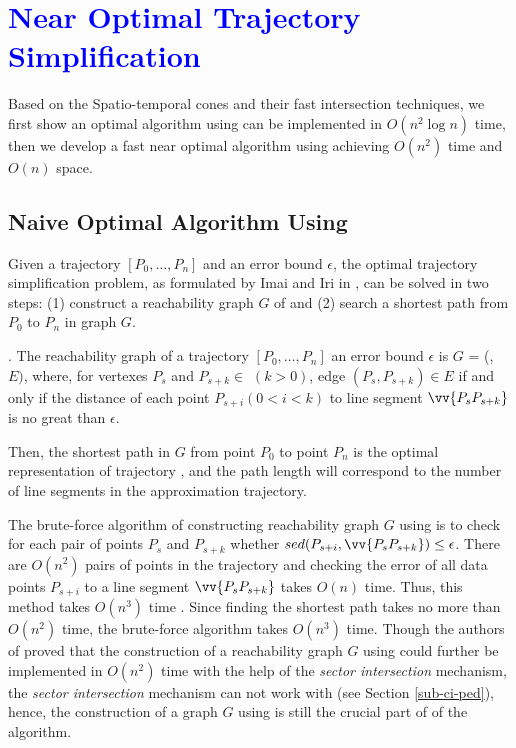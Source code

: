 \section{\textcolor{blue}{Near Optimal Trajectory Simplification}}
\label{sec-optimal}

Based on the Spatio-temporal cones and their fast intersection techniques, we first show an optimal algorithm using \sed can be implemented in $O(n^2\log n)$ time, then we develop a fast near optimal algorithm using \sed achieving $O(n^2)$ time and $O(n)$ space.

\subsection{Naive Optimal Algorithm Using \sed}

Given a trajectory ${[P_0, \ldots, P_n]}$ and an error bound $\epsilon$, the optimal trajectory simplification problem, as formulated by Imai and Iri in \cite{Imai:Optimal}, can be solved in two steps: (1) construct a reachability graph $G$ of  and (2) search a shortest path from $P_0$ to $P_{n}$ in graph $G$.

. The reachability graph of a trajectory ${[P_0, \ldots, P_n]}$ \wrt an error bound $\epsilon$ is $G$
= (, $E)$, where, for vertexes $P_s$ and $P_{s+k} \in$  $(k>0)$, edge $(P_s, P_{s+k}) \in E$ if and only if the distance of each point $P_{s+i} (0<i<k)$ to line segment $\vv{P_sP_{s+k}}$ is no great than $\epsilon$.

Then, the shortest path in $G$ from point $P_0$ to point $P_{n}$ is the optimal representation of trajectory , and the path length will correspond to the number of line segments in the approximation trajectory\cite{Imai:Optimal}. 


The brute-force algorithm of constructing reachability graph $G$ using \sed is to check for each pair of points $P_s$ and $P_{s+k}$ whether $sed(P_{s+i}, \vv{P_sP_{s+k}}) \le \epsilon$. 
There are $O(n^2)$ pairs of points in the trajectory and checking the error of all data points $P_{s+i}$ to a line segment $\vv{P_sP_{s+k}}$ takes $O(n)$ time. 
Thus, this method takes $O(n^3)$ time \cite{Imai:Optimal}. 
Since finding the shortest path takes no more than $O(n^2)$ time, the brute-force algorithm takes $O(n^3)$ time.
%
Though the authors of \cite{Chan:Optimal} proved that the construction of a reachability graph $G$ using \ped could further be implemented in $O(n^2)$ time with the help of the \textit{sector intersection} mechanism, the \textit{sector intersection} mechanism can not work with \sed (see Section \ref{sub-ci-ped}), hence, the construction of a graph  $G$ using \sed is still the crucial part of of the algorithm.
 
